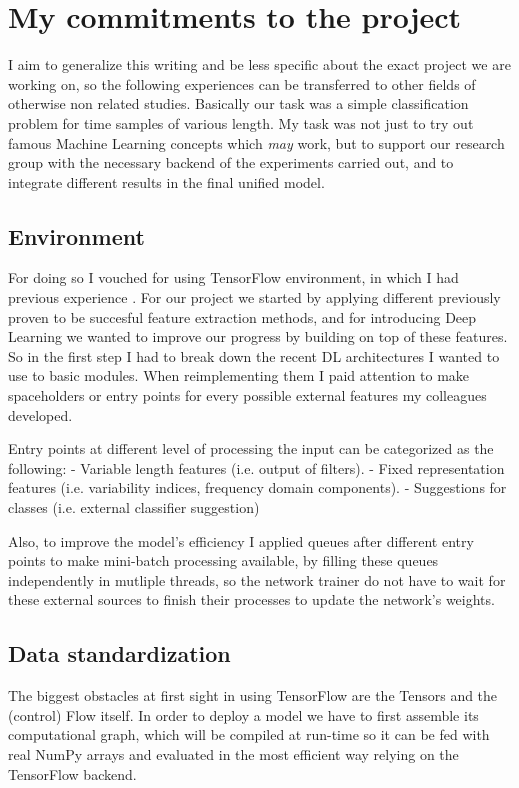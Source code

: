 \section{My commitments to the project}

I aim to generalize this writing and be less specific about the exact project we are working on, so the following experiences can be transferred to other fields of otherwise non related studies.
Basically our task was a simple classification problem for time samples of various length.
My task was not just to try out famous Machine Learning concepts which \textit{may} work, but to support our research group with the necessary backend of the experiments carried out, and to integrate different results in the final unified model.

\subsection{Environment}

For doing so I vouched for using TensorFlow environment, in which I had previous experience \cite{github-projects}.
For our project we started by applying different previously proven to be succesful feature extraction methods, and for introducing Deep Learning we wanted to improve our progress by building on top of these features.
So in the first step I had to break down the recent DL architectures I wanted to use to basic modules.
When reimplementing them I paid attention to make spaceholders or entry points for every possible external features my colleagues developed.

Entry points at different level of processing the input can be categorized as the following:
- Variable length features (i.e. output of filters).
- Fixed representation features (i.e. variability indices, frequency domain components).
- Suggestions for classes (i.e. external classifier suggestion)

Also, to improve the model's efficiency I applied queues after different entry points to make mini-batch processing available, by filling these queues independently in mutliple threads, so the network trainer do not have to wait for these external sources to finish their processes to update the network's weights.

\subsection{Data standardization}

The biggest obstacles at first sight in using TensorFlow are the Tensors and the (control) Flow itself. In order to deploy a model we have to first assemble its computational graph, which will be compiled at run-time so it can be fed with real NumPy arrays and evaluated in the most efficient way relying on the TensorFlow backend.

